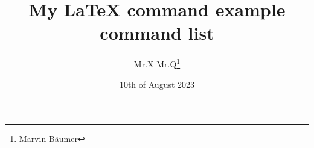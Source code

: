 \documentclass[12pt]{article}
\title{My \LaTeX{} command example command list}
\author{Mr.X Mr.Q\thanks{Marvin Bäumer}}
\date{10th of August 2023}
\begin{document}
\maketitle
\begin{list}{}{Text editing}
    \item[\textbf{bold}]
    \item[\textit{italic}]
    \item [\texttt{mashine}]
    \item [\textcircled{Circled}]
\end{list}
\end{document}
